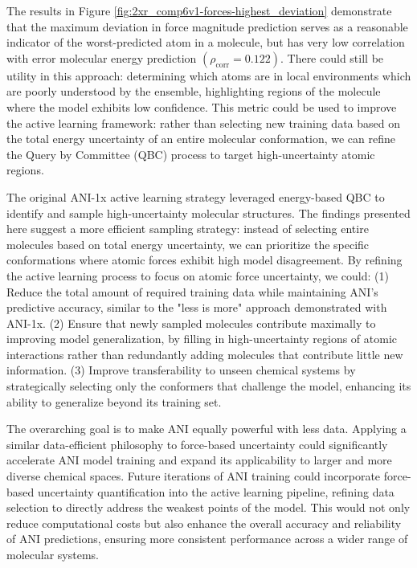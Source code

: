 The results in Figure \ref{fig:2xr_comp6v1-forces-highest_deviation} demonstrate that the maximum deviation in force magnitude prediction serves as a reasonable indicator of the worst-predicted atom in a molecule, but has very low correlation with error molecular energy prediction $(\rho_\text{corr} = 0.122)$.
There could still be utility in this approach: determining which atoms are in local environments which are poorly understood by the ensemble, highlighting regions of the molecule where the model exhibits low confidence. 
This metric could be used to improve the active learning framework: rather than selecting new training data based on the total energy uncertainty of an entire molecular conformation, we can refine the Query by Committee (QBC) process to target high-uncertainty atomic regions.

The original ANI-1x active learning strategy \cite{ani-1x} leveraged energy-based QBC to identify and sample high-uncertainty molecular structures.
The findings presented here suggest a more efficient sampling strategy: instead of selecting entire molecules based on total energy uncertainty, we can prioritize the specific conformations where atomic forces exhibit high model disagreement. 
By refining the active learning process to focus on atomic force uncertainty, we could:
(1) Reduce the total amount of required training data while maintaining ANI’s predictive accuracy, similar to the "less is more" approach demonstrated with ANI-1x. 
(2) Ensure that newly sampled molecules contribute maximally to improving model generalization, by filling in high-uncertainty regions of atomic interactions rather than redundantly adding molecules that contribute little new information. 
(3) Improve transferability to unseen chemical systems by strategically selecting only the conformers that challenge the model, enhancing its ability to generalize beyond its training set.

The overarching goal is to make ANI equally powerful with less data.
Applying a similar data-efficient philosophy to force-based uncertainty could significantly accelerate ANI model training and expand its applicability to larger and more diverse chemical spaces. 
Future iterations of ANI training could incorporate force-based uncertainty quantification into the active learning pipeline, refining data selection to directly address the weakest points of the model. 
This would not only reduce computational costs but also enhance the overall accuracy and reliability of ANI predictions, ensuring more consistent performance across a wider range of molecular systems.


